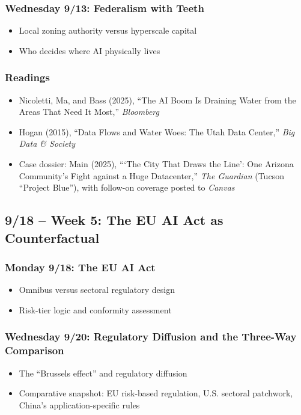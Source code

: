 \documentclass[12pt]{article}
\begin{document}
    \subsubsection*{Wednesday 9/13: Federalism with Teeth}
        \begin{itemize}
            \item Local zoning authority versus hyperscale capital
            \item Who decides where AI physically lives
        \end{itemize}
    \subsubsection*{Readings}
        \begin{itemize}
            \item Nicoletti, Ma, and Bass (2025), ``The AI Boom Is Draining Water from the Areas That Need It Most,'' \emph{Bloomberg}
            \item Hogan (2015), ``Data Flows and Water Woes: The Utah Data Center,'' \emph{Big Data \& Society}
            \item Case dossier: Main (2025), ```The City That Draws the Line': One Arizona Community's Fight against a Huge Datacenter,'' \emph{The Guardian} (Tucson ``Project Blue''), with follow-on coverage posted to \emph{Canvas}
        \end{itemize}

\subsection*{9/18 -- Week 5: The EU AI Act as Counterfactual}
    \subsubsection*{Monday 9/18: The EU AI Act}
        \begin{itemize}
            \item Omnibus versus sectoral regulatory design
            \item Risk-tier logic and conformity assessment
        \end{itemize}
    \subsubsection*{Wednesday 9/20: Regulatory Diffusion and the Three-Way Comparison}
        \begin{itemize}
            \item The ``Brussels effect'' and regulatory diffusion
            \item Comparative snapshot: EU risk-based regulation, U.S. sectoral patchwork, China's application-specific rules
        \end{itemize}
\end{document}
